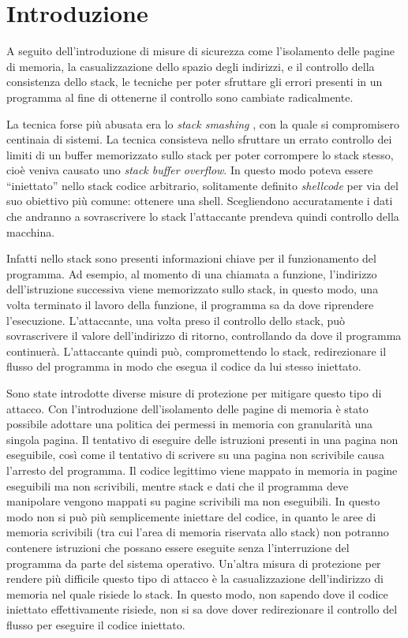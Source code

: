 \thispagestyle{empty}

\clearpage{\pagestyle{empty}\cleardoublepage}
\mainmatter
\chapter*{Introduzione}


A seguito dell'introduzione di misure di sicurezza come l'isolamento
delle pagine di memoria, la casualizzazione dello spazio degli
indirizzi, e il controllo della consistenza dello stack, le tecniche
per poter sfruttare gli errori presenti in un programma al fine di
ottenerne il controllo sono cambiate radicalmente.

La tecnica forse più abusata era lo \emph{stack smashing}
\cite{Phrack-96}, con la quale si compromisero centinaia di
sistemi. La tecnica consisteva nello sfruttare un errato controllo dei
limiti di un buffer memorizzato sullo stack per poter corrompere lo
stack stesso, cioè veniva causato uno \emph{stack buffer overflow}. In
questo modo poteva essere ``iniettato'' nello stack codice arbitrario,
solitamente definito \emph{shellcode} per via del suo obiettivo più
comune: ottenere una shell. Scegliendono accuratamente i dati che
andranno a sovrascrivere lo stack l'attaccante prendeva quindi
controllo della macchina.

Infatti nello stack sono presenti informazioni chiave per il
funzionamento del programma. Ad esempio, al momento di una chiamata a
funzione, l'indirizzo dell'istruzione successiva viene memorizzato
sullo stack, in questo modo, una volta terminato il lavoro della
funzione, il programma sa da dove riprendere
l'esecuzione. L'attaccante, una volta preso il controllo dello stack,
può sovrascrivere il valore dell'indirizzo di ritorno, controllando da
dove il programma continuerà. L'attaccante quindi può, compromettendo
lo stack, redirezionare il flusso del programma in modo che esegua il
codice da lui stesso iniettato.

Sono state introdotte diverse misure di protezione per mitigare questo
tipo di attacco. Con l'introduzione dell'isolamento delle pagine di
memoria è stato possibile adottare una politica dei permessi in
memoria con granularità una singola pagina. Il tentativo di eseguire
delle istruzioni presenti in una pagina non eseguibile, così come il
tentativo di scrivere su una pagina non scrivibile causa l'arresto del
programma. Il codice legittimo viene mappato in memoria in pagine
eseguibili ma non scrivibili, mentre stack e dati che il programma
deve manipolare vengono mappati su pagine scrivibili ma non
eseguibili. In questo modo non si può più semplicemente iniettare del
codice, in quanto le aree di memoria scrivibili (tra cui l'area di
memoria riservata allo stack) non potranno contenere istruzioni che
possano essere eseguite senza l'interruzione del programma da parte
del sistema operativo. Un'altra misura di protezione per rendere più
difficile questo tipo di attacco è la casualizzazione dell'indirizzo
di memoria nel quale risiede lo stack. In questo modo, non sapendo
dove il codice iniettato effettivamente risiede, non si sa dove dover
redirezionare il controllo del flusso per eseguire il codice
iniettato.

